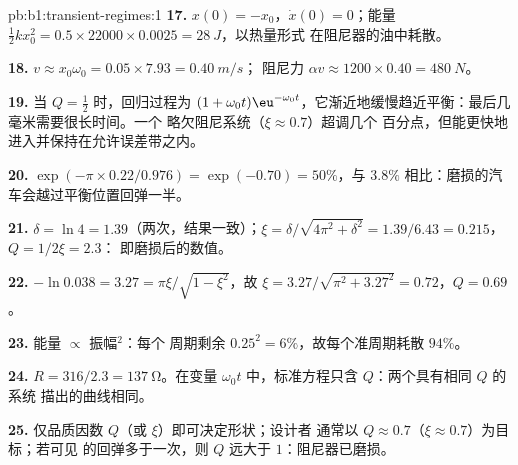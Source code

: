 \begin{solution}{pb:b1:transient-regimes:1}
\textbf{17.} $x(0) = -x_0$，$\dot x(0) = 0$；能量 $\tfrac12 kx_0^2 =
0.5 \times 22000 \times 0.0025 = \qty{28}{J}$，以热量形式
在阻尼器的油中耗散。

\textbf{18.} $v \approx x_0\omega_0 = 0.05 \times 7.93 = \qty{0.40}{m/s}$；
阻尼力 $\alpha v \approx 1200 \times 0.40 = \qty{480}{N}$。

\textbf{19.} 当 $Q = \tfrac12$ 时，回归过程为 $(1 + \omega_0 t)\eu^{-\omega_0
t}$，它渐近地缓慢趋近平衡：最后几毫米需要很长时间。一个
略欠阻尼系统（$\xi \approx 0.7$）超调几个
百分点，但能更快地进入并保持在允许误差带之内。

\textbf{20.} $\exp(-\pi \times 0.22/0.976) = \exp(-0.70) = 50\%$，与
$3.8\%$ 相比：磨损的汽车会越过平衡位置回弹一半。

\textbf{21.} $\delta = \ln 4 = 1.39$（两次，结果一致）；$\xi =
\delta/\sqrt{4\pi^2 + \delta^2} = 1.39/6.43 = 0.215$，$Q = 1/2\xi = 2.3$：
即磨损后的数值。

\textbf{22.} $-\ln 0.038 = 3.27 = \pi\xi/\sqrt{1 - \xi^2}$，故 $\xi =
3.27/\sqrt{\pi^2 + 3.27^2} = 0.72$，$Q = 0.69$。

\textbf{23.} 能量 $\propto$ 振幅$^2$：每个
周期剩余 $0.25^2 = 6\%$，故每个准周期耗散 $94\%$。

\textbf{24.} $R = 316/2.3 = \qty{137}{\ohm}$。在变量 $\omega_0 t$
中，标准方程只含 $Q$：两个具有相同 $Q$ 的系统
描出的曲线相同。

\textbf{25.} 仅品质因数 $Q$（或 $\xi$）即可决定形状；设计者
通常以 $Q \approx 0.7$（$\xi \approx 0.7$）为目标；若可见
的回弹多于一次，则 $Q$ 远大于 $1$：阻尼器已磨损。
\end{solution}
